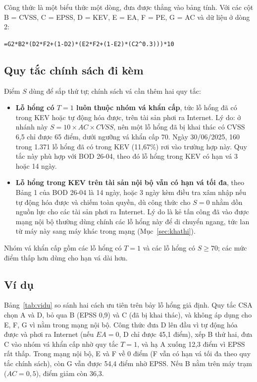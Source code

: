 \documentclass[runningheads]{llncs}
\begin{document}
Công thức là một biểu thức một dòng, đưa được thẳng vào bảng tính. Với các cột B = CVSS, C = EPSS, D = KEV,
E = EA, F = PE, G = AC và dữ liệu ở dòng 2:
\begin{center}\footnotesize\verb|=G2*B2*(D2*F2+(1-D2)*(E2*F2+(1-E2)*(C2^0.3)))*10|\end{center}

\subsection{Quy tắc chính sách đi kèm}

Điểm $S$ dùng để sắp thứ tự; chính sách vá cần thêm hai quy tắc:
\begin{itemize}
\item \textbf{Lỗ hổng có $T = 1$ luôn thuộc nhóm vá khẩn cấp}, tức lỗ hổng đã có trong KEV hoặc tự động
hóa được, trên tài sản phơi ra Internet. Lý do: ở nhánh này $S = 10 \times AC \times \mathit{CVSS}$, nên
một lỗ hổng đã bị khai thác có CVSS 6,5 chỉ được 65 điểm, dưới ngưỡng vá khẩn cấp 70. Ngày 30/06/2025,
160 trong 1.371 lỗ hổng đã có trong KEV (11,67\%) rơi vào trường hợp này. Quy tắc này phù hợp với BOD
26-04, theo đó lỗ hổng trong KEV có hạn vá 3 hoặc 14 ngày.
\item \textbf{Lỗ hổng trong KEV trên tài sản nội bộ vẫn có hạn vá tối đa}, theo Bảng 1 của BOD 26-04 là 14 ngày, hoặc 3 ngày kèm điều tra xâm nhập nếu tự động hóa được và chiếm toàn quyền,
dù công thức cho $S = 0$ nhằm dồn nguồn lực cho các tài sản phơi ra Internet. Lý do là kẻ tấn công đã vào được mạng nội
bộ thường dùng chính các lỗ hổng này để di chuyển ngang, tức lan từ máy này sang máy khác trong mạng (Mục~\ref{sec:khathi}).
\end{itemize}
Nhóm vá khẩn cấp gồm các lỗ hổng có $T = 1$ và các lỗ hổng có $S \ge 70$; các mức điểm thấp hơn dùng
cho hạn vá dài hơn.

\subsection{Ví dụ}

Bảng~\ref{tab:vidu} so sánh hai cách ưu tiên trên bảy lỗ hổng giả định. Quy tắc CSA chọn A và D, bỏ qua B (EPSS 0,9) và C
(đã bị khai thác), và không áp dụng cho E, F, G vì nằm trong mạng nội bộ. Công thức đưa D lên đầu vì tự
động hóa được và phơi ra Internet (nếu $\mathit{EA} = 0$, D chỉ được 45,1 điểm), xếp B thứ hai, đưa C vào
nhóm vá khẩn cấp nhờ quy tắc $T = 1$, và hạ A xuống 12,3 điểm vì EPSS rất thấp. Trong mạng nội bộ, E và F
về 0 điểm (F vẫn có hạn vá tối đa theo quy tắc chính sách), còn G vẫn được 54,4 điểm nhờ EPSS. Nếu B nằm
trên máy trạm ($AC = 0{,}5$), điểm giảm còn 36,3.
\end{document}
